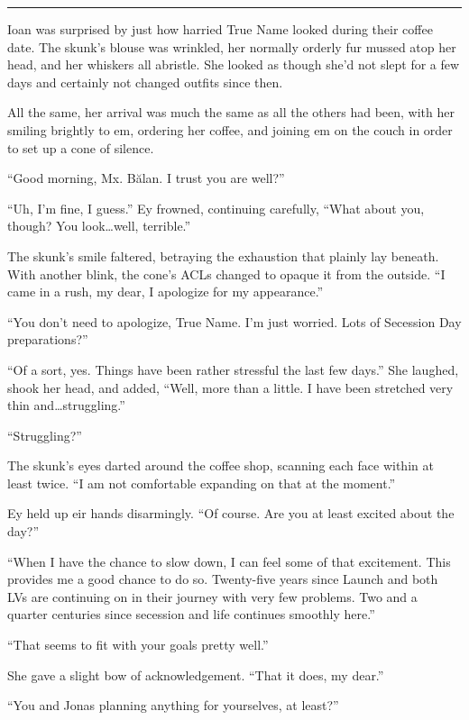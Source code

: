 \begin{center}\rule{0.5\linewidth}{0.5pt}\end{center}

Ioan was surprised by just how harried True Name looked during their coffee date. The skunk's blouse was wrinkled, her normally orderly fur mussed atop her head, and her whiskers all abristle. She looked as though she'd not slept for a few days and certainly not changed outfits since then.

All the same, her arrival was much the same as all the others had been, with her smiling brightly to em, ordering her coffee, and joining em on the couch in order to set up a cone of silence.

``Good morning, Mx. Bălan. I trust you are well?''

``Uh, I'm fine, I guess.'' Ey frowned, continuing carefully, ``What about you, though? You look\ldots well, terrible.''

The skunk's smile faltered, betraying the exhaustion that plainly lay beneath. With another blink, the cone's ACLs changed to opaque it from the outside. ``I came in a rush, my dear, I apologize for my appearance.''

``You don't need to apologize, True Name. I'm just worried. Lots of Secession Day preparations?''

``Of a sort, yes. Things have been rather stressful the last few days.'' She laughed, shook her head, and added, ``Well, more than a little. I have been stretched very thin and\ldots struggling.''

``Struggling?''

The skunk's eyes darted around the coffee shop, scanning each face within at least twice. ``I am not comfortable expanding on that at the moment.''

Ey held up eir hands disarmingly. ``Of course. Are you at least excited about the day?''

``When I have the chance to slow down, I can feel some of that excitement. This provides me a good chance to do so. Twenty-five years since Launch and both LVs are continuing on in their journey with very few problems. Two and a quarter centuries since secession and life continues smoothly here.''

``That seems to fit with your goals pretty well.''

She gave a slight bow of acknowledgement. ``That it does, my dear.''

``You and Jonas planning anything for yourselves, at least?''

